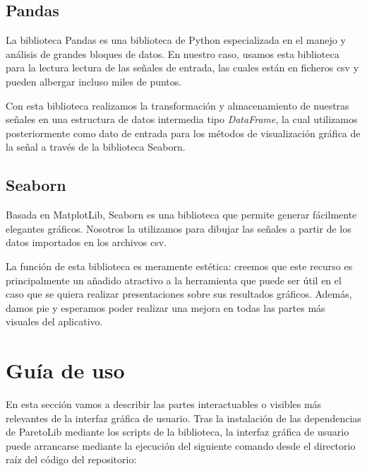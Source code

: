  
 
\subsection{Pandas}
La biblioteca Pandas es una biblioteca de Python especializada en el manejo y análisis de grandes bloques de datos. En nuestro caso, usamos esta biblioteca para la lectura lectura de las señales de entrada, las cuales están en ficheros csv y pueden albergar incluso miles de puntos.

Con esta biblioteca realizamos la transformación y almacenamiento de nuestras señales en una estructura de datos intermedia tipo \textit{DataFrame}, la cual utilizamos posteriormente como dato de entrada para los métodos de visualización gráfica de la señal a través de la biblioteca Seaborn.
 
 

\subsection{Seaborn} 
Basada en MatplotLib, Seaborn es una biblioteca que permite generar fácilmente elegantes gráficos. Nosotros la utilizamos para dibujar las señales a partir de los datos importados en los archivos csv.

La función de esta biblioteca es meramente estética: creemos que este recurso es principalmente un añadido atractivo a la herramienta que puede ser útil en el caso que se quiera realizar presentaciones sobre sus resultados gráficos. Además, damos pie y esperamos poder realizar una mejora en todas las partes más visuales del aplicativo.
 
 

\section{Guía de uso}
En esta sección vamos a describir las partes interactuables o visibles más relevantes de la interfaz gráfica de usuario.
Tras la instalación de las dependencias de ParetoLib mediante los scripts de la biblioteca, la interfaz gráfica de usuario puede arrancarse mediante la ejecución del siguiente comando desde el directorio raíz del código del repositorio:

